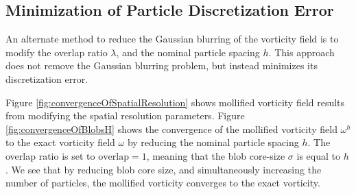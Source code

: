 \subsection{Minimization of Particle Discretization Error}
\label{subsubsec:convergenceInterpolation}
An alternate method to reduce the Gaussian blurring of the vorticity field is to modify the overlap ratio $\lambda$, and the nominal particle spacing $h$. This approach does not remove the Gaussian blurring problem, but instead minimizes its discretization error.
	

Figure \ref{fig:convergenceOfSpatialResolution} shows mollified vorticity field results from modifying the spatial resolution parameters. Figure \ref{fig:convergenceOfBlobsH} shows the convergence of the mollified vorticity field $\omega^h$ to the exact vorticity field $\omega$ by reducing the nominal particle spacing $h$. The overlap ratio is set to $\mathrm{overlap} = 1$, meaning that the blob core-size $\sigma$ is equal to $h$. We see that by reducing blob core size, and simultaneously increasing the number of particles, the mollified vorticity converges to the exact vorticity. 


